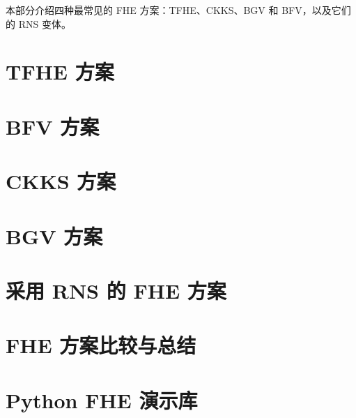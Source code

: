 \documentclass[11pt]{article}
\begin{document}
本部分介绍四种最常见的 FHE 方案：TFHE、CKKS、BGV 和 BFV，以及它们的 RNS 变体。

\newpage

\section{TFHE 方案}
\label{sec:tfhe}



\newpage

\section{BFV 方案}
\label{sec:bfv}


\newpage

\section{CKKS 方案}
\label{sec:ckks}



\clearpage

\section{BGV 方案}
\label{sec:bgv}


\clearpage


\section{采用 RNS 的 FHE 方案}
\label{sec:rns}


\clearpage

\section{FHE 方案比较与总结}



\clearpage

\section{Python FHE 演示库}


%
\clearpage






%
\end{document}
